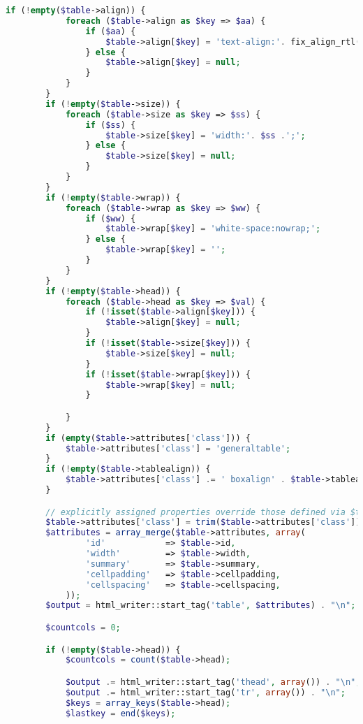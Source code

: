 \begin{lstlisting}[language=PHP]
        if (!empty($table->align)) {
            foreach ($table->align as $key => $aa) {
                if ($aa) {
                    $table->align[$key] = 'text-align:'. fix_align_rtl($aa) .';';  // Fix for RTL languages
                } else {
                    $table->align[$key] = null;
                }
            }
        }
        if (!empty($table->size)) {
            foreach ($table->size as $key => $ss) {
                if ($ss) {
                    $table->size[$key] = 'width:'. $ss .';';
                } else {
                    $table->size[$key] = null;
                }
            }
        }
        if (!empty($table->wrap)) {
            foreach ($table->wrap as $key => $ww) {
                if ($ww) {
                    $table->wrap[$key] = 'white-space:nowrap;';
                } else {
                    $table->wrap[$key] = '';
                }
            }
        }
        if (!empty($table->head)) {
            foreach ($table->head as $key => $val) {
                if (!isset($table->align[$key])) {
                    $table->align[$key] = null;
                }
                if (!isset($table->size[$key])) {
                    $table->size[$key] = null;
                }
                if (!isset($table->wrap[$key])) {
                    $table->wrap[$key] = null;
                }

            }
        }
        if (empty($table->attributes['class'])) {
            $table->attributes['class'] = 'generaltable';
        }
        if (!empty($table->tablealign)) {
            $table->attributes['class'] .= ' boxalign' . $table->tablealign;
        }

        // explicitly assigned properties override those defined via $table->attributes
        $table->attributes['class'] = trim($table->attributes['class']);
        $attributes = array_merge($table->attributes, array(
                'id'            => $table->id,
                'width'         => $table->width,
                'summary'       => $table->summary,
                'cellpadding'   => $table->cellpadding,
                'cellspacing'   => $table->cellspacing,
            ));
        $output = html_writer::start_tag('table', $attributes) . "\n";

        $countcols = 0;

        if (!empty($table->head)) {
            $countcols = count($table->head);

            $output .= html_writer::start_tag('thead', array()) . "\n";
            $output .= html_writer::start_tag('tr', array()) . "\n";
            $keys = array_keys($table->head);
            $lastkey = end($keys);


\end{lstlisting}
